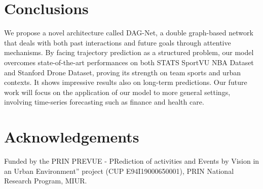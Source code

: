 \documentclass[10pt,a4paper,conference]{IEEEtran}
\begin{document}
\begin{comment}
    \begin{table}[ht]
        \renewcommand{\arraystretch}{1.3}
        \label{RECAP TABLE}
        \centering
        \caption{OUR MODELS - \textcolor{red}{REMOVE THIS TABLE}}
        \begin{tabular}{c|c|ccc}
            \hline
            \textbf{DSET} & \textbf{Model} & \textbf{ADE} & \textbf{FDE}\\
            \hline \hline
                    & Graph-on-hiddens (NO team recurr) & 8.95 & 14.79 \\
            BSK-ATK & Graph-on-hiddens + team recurr & 8.89 & 14.54 \\
                    & Double-graph & 9.18 & 13.54 \\
            \hline
                    & Graph-on-hiddens (NO team recurr) & 6.96 & 10.50 \\
            BSK-DEF & Graph-on-hiddens + team recurr & 6.94 & 9.39 \\
                    & Double-graph & 7.01 & 9.76 \\
            \hline
                    & Graph-on-hiddens (NO team recurr) & 0.52 & 1.05 \\
                SDD & Graph-on-hiddens + team recurr & 0.49 & 0.97 \\ 
                    & Double-graph & 0.54 & 1.05 \\
            \hline
        \end{tabular}
    \end{table}
\end{comment} \section{Conclusions}
We propose a novel architecture called DAG-Net, a double graph-based network that deals with both past interactions and future goals through attentive mechanisms. By facing trajectory prediction as a structured problem, our model overcomes state-of-the-art performances on both STATS SportVU NBA Dataset and Stanford Drone Dataset, proving its strength on team sports and urban contexts. It shows impressive results also on long-term predictions.
Our future work will focus on the application of our model to more general settings, involving time-series forecasting such as finance and health care.
 \section*{Acknowledgements}
Funded by the PRIN PREVUE - PRediction of activities and Events by Vision in an Urban Environment” project (CUP E94I19000650001), PRIN National Research Program, MIUR.

%
 

































\end{document}
